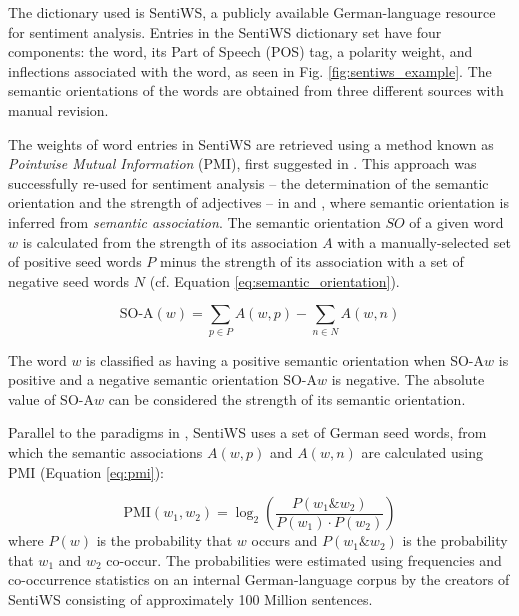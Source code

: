 \documentclass[9pt,twocolumn,twoside,lineno]{pnas-new}
\begin{document}
The dictionary used is SentiWS, a publicly available German-language resource for sentiment analysis. \cite{REMUS10.490} Entries in the SentiWS dictionary set have four components: the word, its Part of Speech (POS) tag, a polarity weight, and inflections associated with the word, as seen in Fig. \ref{fig:sentiws_example}. The semantic orientations of the words are obtained from three different sources with manual revision. 

The weights of word entries in SentiWS are retrieved using a method known as \emph{Pointwise Mutual Information} (PMI), first suggested in \cite{church-hanks-1990-word}. This approach was successfully re-used for sentiment analysis -- the determination of the semantic orientation and the strength of adjectives -- in \cite{Turney2002} and \cite{Turney2003}, where semantic orientation is inferred from \emph{semantic association}. The semantic orientation \(SO\) of a given word \(w\) is calculated from the strength of its association \(A\) with a manually-selected set of positive seed words \(P\) minus the strength of its association with a set of negative seed words \(N\) (cf. Equation \ref{eq:semantic_orientation}). 

\begin{equation}
\label{eq:semantic_orientation}
\text{SO-A}(w) = \sum_{p \in P}A(w,p) - \sum_{n \in N}A(w,n)
\end{equation}

The word \(w\) is classified as having a positive semantic orientation when SO-A\(w\) is positive and a negative semantic orientation SO-A\(w\) is negative. The absolute value of SO-A\(w\) can be considered the strength of its semantic orientation. 

Parallel to the paradigms in \cite{Turney2003}, SentiWS uses a set of German seed words, from which the semantic associations \(A(w,p)\) and \(A(w,n)\) are calculated using PMI (Equation \ref{eq:pmi}): 

\begin{equation}
\label{eq:pmi}
\text{PMI}(w_1,w_2) = \log_2\left(\frac{P(w_1 \& w_2)}{P(w_1) \cdot P(w_2)}\right)
\end{equation}
where \(P(w)\) is the probability that \(w\) occurs and \(P(w_1 \& w_2)\) is the probability that \(w_1\) and \(w_2\) co-occur. The probabilities were estimated using frequencies and co-occurrence statistics on an internal German-language corpus by the creators of SentiWS consisting of approximately 100 Million sentences.  
\end{document}
